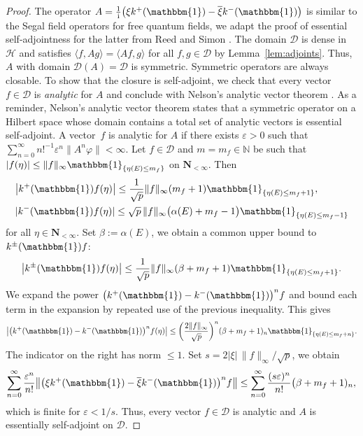 \documentclass[11pt]{article}
\numberwithin{equation}{section}
\numberwithin{equation}{section}
\newcommand{\N}{\mathbb{N}}
\newcommand{\eps}{\varepsilon}
\newcommand{\la}{\langle}
\newcommand{\ra}{\rangle}
\newcommand{\1}{\mathbbm{1}}
\begin{document}
\begin{proof}
	The operator $A = \frac{1}{\mathrm i} \bigl( \xi k^+(\1)- \overline{\xi} k^-(\1)\bigr)$ is similar to the Segal field operators for free quantum fields, we adapt the proof of essential self-adjointness for the latter from Reed and Simon \cite[Theorem X.41\,(a)]{reedSimonII}.
	The domain $\mathcal D$ is dense in $\mathcal H$ and satisfies $\la f, A g\ra = \la Af, g\ra$ for all $f,g\in \mathcal D$ by Lemma~\ref{lem:adjoints}. Thus, $A$ with domain $\mathcal D(A) = \mathcal D$ is symmetric. Symmetric operators are always closable. 	
	To show that the closure is self-adjoint, we check that every vector $f\in \mathcal D$ is \emph{analytic} for $A$ and conclude with Nelson's analytic vector theorem \cite[Theorem~X.39]{reedSimonII}.
 As a reminder, Nelson's analytic vector theorem states that a symmetric operator on a Hilbert space whose domain contains a total set of analytic vectors is essential self-adjoint.
 A vector~$f$ is analytic for $A$ if there exists $\eps>0$ such that $\sum_{n=0}^\infty n!^{-1} \eps^n \| A^n \varphi\|<\infty$.
	Let $f\in \mathcal D$ and $m=m_f\in \N$ be such that $|f(\eta)|\leq \|f\|_\infty \1_{\{\eta(E)\leq m_f\}}$ on $\mathbf N_{<\infty}$. Then
	\begin{align*}
		&\bigl| k^+(\1) f(\eta)\bigr| \leq \frac{1}{\sqrt p} \|f\|_\infty (m_f+1) \1_{\{\eta(E) \leq m_f+1\}},\\
		&| k^-(\1) f(\eta)| \leq \sqrt p\, \|f\|_\infty \bigl(\alpha(E)+m_f-1\bigr) \1_{\{\eta(E) \leq m_f-1\}}
	\end{align*} 	
	for all $\eta \in \mathbf N_{<\infty}$. Set $\beta:= \alpha(E)$, we obtain a common upper bound to $k^\pm(\1) f$:
	\[
		\bigl| k^\pm(\1) f(\eta)\bigr| \leq \frac{1}{\sqrt p} \|f\|_\infty (\beta +m_f+1) \1_{\{\eta(E) \leq m_f + 1\}}.
	\]
	We expand the power $\bigl(k^+(\1) - k^-(\1)\bigr)^n f$ and bound each term in the expansion by repeated use of the previous inequality. This gives
	\[
		\bigl| \bigl(k^+(\1) - k^-(\1)\bigr)^n f(\eta)\bigr| \leq \biggl(\frac{ 2 \| f\|_\infty}{\sqrt p}\biggr)^{n} ( \beta + m_f + 1)_n \1_{\{\eta(E)\leq m_f+n\}}.
	\] 	
	The indicator on the right has norm $\leq 1$. Set $s = 2|\xi|\, \|f\|_\infty/\sqrt p$, we obtain
	\[
		\sum_{n=0}^\infty \frac{\eps^n}{n!} \bigl\| \bigl(\xi k^+(\1) -\overline{\xi} k^-(\1)\bigr)^n f \bigr\|
			 \leq \sum_{n=0}^\infty \frac{(s\eps)^n}{n!} \bigl(\beta + m_f + 1)_n,
	\] 	
	which is finite for $\eps< 1/s$. Thus, every vector $f\in \mathcal D$ is analytic and $A$ is essentially self-adjoint on $\mathcal D$. 		
\end{proof}
\end{document}
